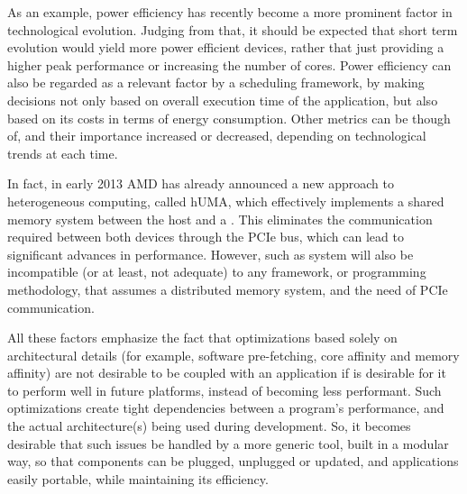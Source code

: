 \documentclass[main.tex]{subfiles}
\begin{document}
As an example, power efficiency has recently become a more prominent factor in technological evolution. Judging from that, it should be expected that short term evolution would yield more power efficient devices, rather that just providing a higher peak performance or increasing the number of cores. Power efficiency can also be regarded as a relevant factor by a scheduling framework, by making decisions not only based on overall execution time of the application, but also based on its costs in terms of energy consumption.
Other metrics can be though of, and their importance increased or decreased, depending on technological trends at each time.

In fact, in early 2013 AMD has already announced a new approach to heterogeneous computing, called \acs{hUMA}, which effectively implements a shared memory system between the host \cpu and a \gpu \cite{hUMA}. This eliminates the communication required between both devices through the \acs{PCIe} bus, which can lead to significant advances in performance. However, such as system will also be incompatible (or at least, not adequate) to any framework, or programming methodology, that assumes a distributed memory system, and the need of \acs{PCIe} communication.

All these factors emphasize the fact that optimizations based solely on architectural details (for example, software pre-fetching, core affinity and memory affinity) are not desirable to be coupled with an application if is desirable for it to perform well in future platforms, instead of becoming less performant. Such optimizations create tight dependencies between a program's performance, and the actual architecture(s) being used during development. So, it becomes desirable that such issues be handled by a more generic tool, built in a modular way, so that components can be plugged, unplugged or updated, and applications easily portable, while maintaining its efficiency.
\end{document}
